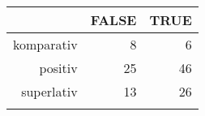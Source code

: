 \begin{tabular}{rrr}
  \lsptoprule
 & FALSE & TRUE \\ 
  \midrule
komparativ & 8 & 6 \\ 
  positiv & 25 & 46 \\ 
  superlativ & 13 & 26 \\ 
   \lspbottomrule
\end{tabular}
